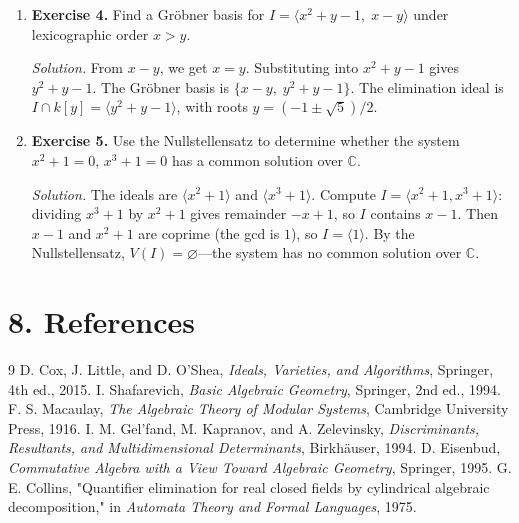 \begin{enumerate}[leftmargin=*,itemsep=0.9em]
\item \textbf{Exercise 4.} Find a Gr\"obner basis for $I=\langle x^2+y-1,\;x-y\rangle$ under lexicographic order $x>y$.

\emph{Solution.} From $x-y$, we get $x=y$. Substituting into $x^2+y-1$ gives $y^2+y-1$. The Gr\"obner basis is $\{x-y,\;y^2+y-1\}$. The elimination ideal is $I\cap k[y]=\langle y^2+y-1\rangle$, with roots $y=(-1\pm\sqrt{5})/2$.

\item \textbf{Exercise 5.} Use the Nullstellensatz to determine whether the system $x^2+1=0$, $x^3+1=0$ has a common solution over $\mathbb C$.

\emph{Solution.} The ideals are $\langle x^2+1\rangle$ and $\langle x^3+1\rangle$. Compute $I=\langle x^2+1,x^3+1\rangle$: dividing $x^3+1$ by $x^2+1$ gives remainder $-x+1$, so $I$ contains $x-1$. Then $x-1$ and $x^2+1$ are coprime (the gcd is $1$), so $I=\langle1\rangle$. By the Nullstellensatz, $V(I)=\varnothing$---the system has no common solution over $\mathbb C$.

\end{enumerate}
\section*{8. References}


\begin{thebibliography}{9}
 D. Cox, J. Little, and D. O'Shea, \emph{Ideals, Varieties, and Algorithms}, Springer, 4th ed., 2015.
 I. Shafarevich, \emph{Basic Algebraic Geometry}, Springer, 2nd ed., 1994.
 F. S. Macaulay, \emph{The Algebraic Theory of Modular Systems}, Cambridge University Press, 1916.
 I. M. Gel'fand, M. Kapranov, and A. Zelevinsky, \emph{Discriminants, Resultants, and Multidimensional Determinants}, Birkhäuser, 1994.
 D. Eisenbud, \emph{Commutative Algebra with a View Toward Algebraic Geometry}, Springer, 1995.
 G. E. Collins, "Quantifier elimination for real closed fields by cylindrical algebraic decomposition," in \emph{Automata Theory and Formal Languages}, 1975.
\end{thebibliography}
